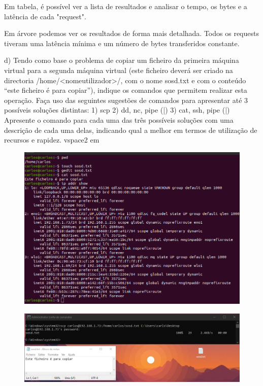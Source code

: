 \documentclass{article}
\begin{document}
	\vspace{1 em}
	Em tabela, é possível ver a lista de resultados e analisar o tempo, os bytes e a latência de cada "request". 
	
	\vspace{1 em}
	Em árvore podemos ver os resultados de forma mais detalhada.
	Todos os requests tiveram uma latência mínima e um número de bytes transferidos constante.

	\newpage
	d) Tendo como base o problema de copiar um ficheiro da primeira máquina
	virtual para a segunda máquina virtual (este ficheiro deverá ser criado na
	directoria /home/<nomeutilizador>/, com o nome sosd.txt e com o conteúdo
	“este ficheiro é para copiar”), indique os comandos que permitem realizar esta
	operação.
	Faça uso das seguintes sugestões de comandos para apresentar até 3 possíveis
	soluções distintas:
	1) scp
	2) dd, nc, pipe (|)
	3) cat, ssh, pipe (|)
	Apresente o comando para cada uma das três possíveis soluções com uma
	descrição de cada uma delas, indicando qual a melhor em termos de utilização
	de recursos e rapidez.
	vspace{2 em}
	
	\begin{figure}[!htb]
		\centering
		\includegraphics[scale=0.4]{tp_sosd_d1}
	\end{figure}
	
	\vspace{1,5 em}
	
	\begin{figure}[!htb]
		\centering
		\includegraphics[scale=0.5]{tp_sosd_d2}
	\end{figure}
\end{document}
